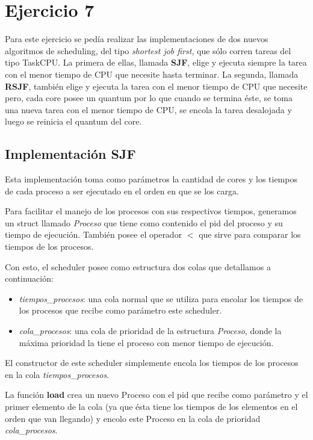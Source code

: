 \section{Ejercicio 7}

Para este ejercicio se pedía realizar las implementaciones de dos nuevos algoritmos de scheduling, del tipo \emph{shortest job first}, que sólo corren tareas del tipo TaskCPU.
La primera de ellas, llamada \textbf{SJF}, elige y ejecuta siempre la tarea con el menor tiempo de CPU que necesite hasta terminar.
La segunda, llamada \textbf{RSJF}, también elige y ejecuta la tarea con el menor tiempo de CPU que necesite pero, cada core posee un quantum por lo que cuando se termina éste, se toma una nueva tarea con el menor tiempo de CPU, se encola la tarea desalojada y luego se reinicia el quantum del core.

\subsection{Implementación \textbf{SJF}}

Esta implementación toma como parámetros la cantidad de cores y los tiempos de cada proceso a ser ejecutado en el orden en que se los carga.

Para facilitar el manejo de los procesos con sus respectivos tiempos, generamos un struct llamado \emph{Proceso} que tiene como contenido el pid del proceso y su tiempo de ejecución. También posee el operador $<$ que sirve para comparar los tiempos de los procesos.

Con esto, el scheduler posee como estructura dos colas que detallamos a continuación:

\begin{itemize}

\item \emph{tiempos\_procesos}: una cola normal que se utiliza para encolar los tiempos de los procesos que recibe como parámetro este scheduler.

\item \emph{cola\_procesos}: una cola de prioridad de la estructura \emph{Proceso}, donde la máxima prioridad la tiene el proceso con menor tiempo de ejecución.

\end{itemize}

El constructor de este scheduler simplemente encola los tiempos de los procesos en la cola \emph{tiempos\_procesos}.

La función \textbf{load} crea un nuevo Proceso con el pid que recibe como parámetro y el primer elemento de la cola (ya que ésta tiene los tiempos de los elementos en el orden que van llegando) y encolo este Proceso en la cola de prioridad \emph{cola\_procesos}.

